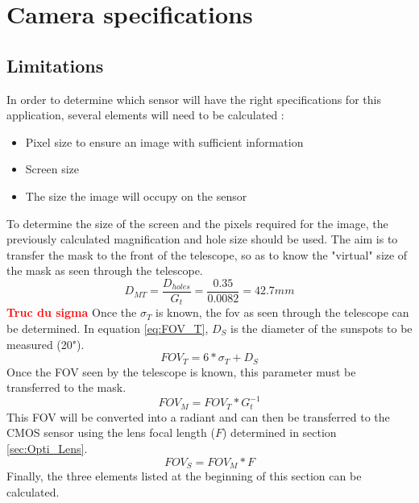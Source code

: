 \section{Camera specifications}\label{sec:Opti_Cam}
\subsection{Limitations}
In order to determine which sensor will have the right specifications for this application,
several elements will need to be calculated :
\begin{itemize}
    \item Pixel size to ensure an image with sufficient information
    \item Screen size
    \item The size the image will occupy on the sensor
\end{itemize}
\bigbreak
To determine the size of the screen and the pixels required for the image, the previously 
calculated magnification and hole size should be used. 
The aim is to transfer the mask to the front of the telescope, so as to know the "virtual" size of the mask as 
seen through the telescope.
\begin{equation}\label{eq:DMT}
    D_{MT} = \frac{D_{holes}}{G_t} = \frac{0.35}{0.0082} = 42.7mm
\end{equation}
\textbf{\textcolor{red}{Truc du sigma}}
\newline
Once the $\sigma_T$ is known, the fov as seen through the telescope can be determined. In equation \ref{eq:FOV_T}, $D_S$ is the diameter
of the sunspots to be measured (20").
\begin{equation}\label{eq:FOV_T}
    FOV_T = 6 * \sigma_T + D_S
\end{equation}
Once the FOV seen by the telescope is known, this parameter must be transferred to the mask.
\begin{equation}
    FOV_M = FOV_T * G_t^{-1}
\end{equation}
This FOV will be converted into a radiant and can then be transferred to the CMOS sensor
using the lens focal length ($F$) determined in section \ref{sec:Opti_Lens}.
\begin{equation}
    FOV_S = FOV_M * F
\end{equation}
Finally, the three elements listed at the beginning of this section can be calculated.
